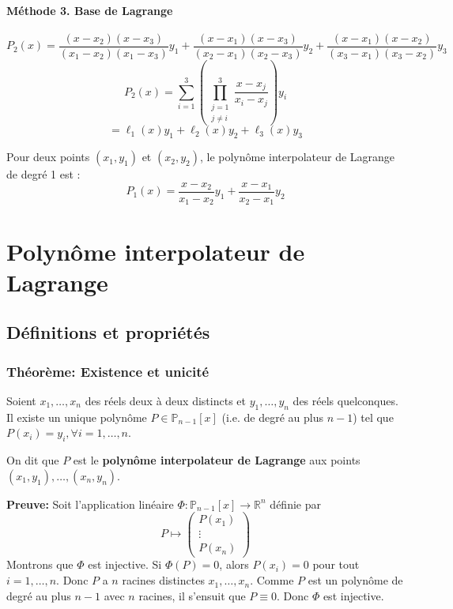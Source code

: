 \documentclass[oneside]{book}
\begin{document}
\paragraph{Méthode 3. Base de Lagrange}

\[
P_2(x) = \frac{(x-x_2)(x-x_3)}{(x_1-x_2)(x_1-x_3)} y_1 + \frac{(x-x_1)(x-x_3)}{(x_2-x_1)(x_2-x_3)} y_2 + \frac{(x-x_1)(x-x_2)}{(x_3-x_1)(x_3-x_2)} y_3
\]
\[
P_2(x) = \sum_{i=1}^3 \left( \prod_{\substack{j=1 \\ j \neq i}}^3 \frac{x-x_j}{x_i-x_j} \right) y_i
\]
\[
= \ell_1(x) y_1 + \ell_2(x) y_2 + \ell_3(x) y_3
\]

\begin{remark}
Pour deux points $(x_1, y_1)$ et $(x_2, y_2)$, le polynôme interpolateur de Lagrange de degré 1 est :
\[
P_1(x) = \frac{x-x_2}{x_1-x_2} y_1 + \frac{x-x_1}{x_2-x_1} y_2
\]
\end{remark}

\section{Polynôme interpolateur de Lagrange}

\subsection{Définitions et propriétés}

\subsubsection{Théorème: Existence et unicité}

\begin{theorem}
Soient $x_1, \dots, x_n$ des réels deux à deux distincts et $y_1, \dots, y_n$ des réels quelconques.
Il existe un unique polynôme $P \in \mathbb{P}_{n-1}[x]$ (i.e. de degré au plus $n-1$) tel que $P(x_i) = y_i, \forall i = 1, \dots, n$.

On dit que $P$ est le \textbf{polynôme interpolateur de Lagrange} aux points $(x_1, y_1), \dots, (x_n, y_n)$.
\end{theorem}

\textbf{Preuve:}
Soit l'application linéaire $\Phi : \mathbb{P}_{n-1}[x] \to \mathbb{R}^n$ définie par
\[
P \mapsto \begin{pmatrix} P(x_1) \\ \vdots \\ P(x_n) \end{pmatrix}
\]
Montrons que $\Phi$ est injective.
Si $\Phi(P) = 0$, alors $P(x_i) = 0$ pour tout $i=1, \dots, n$. Donc $P$ a $n$ racines distinctes $x_1, \dots, x_n$.
Comme $P$ est un polynôme de degré au plus $n-1$ avec $n$ racines, il s'ensuit que $P \equiv 0$.
Donc $\Phi$ est injective.
\end{document}
